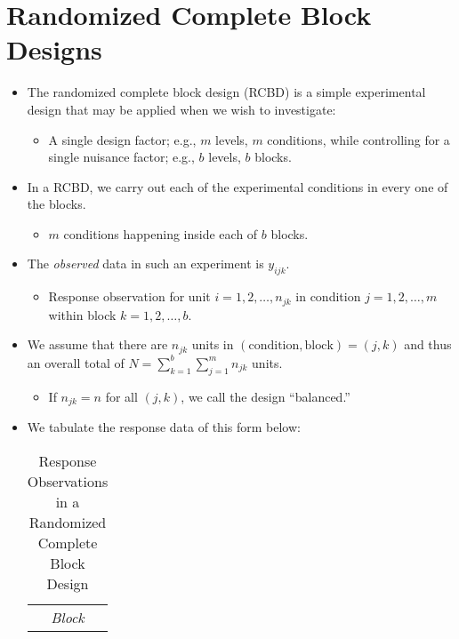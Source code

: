 \section{Randomized Complete Block Designs}
\begin{itemize}
      \item The randomized complete block design (RCBD) is a simple experimental design that may be applied
            when we wish to investigate:
            \begin{itemize}
                  \item A single design factor; e.g., $ m $ levels, $ m $ conditions, while controlling for a single nuisance factor; e.g., $ b $ levels, $ b $ blocks.
            \end{itemize}
      \item In a RCBD, we carry out each of the experimental conditions in every one of the blocks.
            \begin{itemize}
                  \item $ m $ conditions happening inside each of $ b $ blocks.
            \end{itemize}
      \item The \emph{observed} data in such an experiment is $ y_{ijk} $.
            \begin{itemize}
                  \item Response observation for unit $ i=1,2,\ldots,n_{jk} $ in condition $ j=1,2,\ldots,m $
                        within block $ k=1,2,\ldots,b $.
            \end{itemize}
      \item We assume that there are $n_{jk}$ units in $ (\text{condition}, \text{block}) = (j, k) $ and thus an overall total of
            $ N=\sum_{k=1}^{b} \sum_{j=1}^{m} n_{jk} $ units.
            \begin{itemize}
                  \item If $ n_{jk}=n $ for all $ (j,k) $, we call the design ``balanced.''
            \end{itemize}
      \item We tabulate the response data of this form below:
            \begin{table}[!htbp]
                  \centering
                  \caption{Response Observations in a Randomized Complete Block Design}
                  \begin{NiceTabular}{cc|cccc|c}
                               &  &                                                                                                                                                                                                                           \\

\end{NiceTabular}
\end{table}
\end{itemize}
